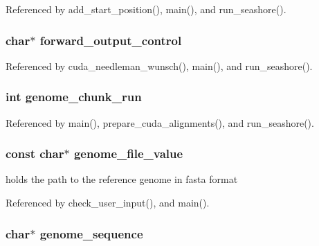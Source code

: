 Referenced by add\_\-start\_\-position(), main(), and run\_\-seashore().
\subsubsection[{forward\_\-output\_\-control}]{\setlength{\rightskip}{0pt plus 5cm}char$\ast$ {\bf forward\_\-output\_\-control}}\label{saruman_8h_a9bcc1c47ac7531838eb940e9fec11d6}




Referenced by cuda\_\-needleman\_\-wunsch(), main(), and run\_\-seashore().
\subsubsection[{genome\_\-chunk\_\-run}]{\setlength{\rightskip}{0pt plus 5cm}int {\bf genome\_\-chunk\_\-run}}\label{saruman_8h_ec3c87c657281aeef6d94cbbac6dba5a}




Referenced by main(), prepare\_\-cuda\_\-alignments(), and run\_\-seashore().
\subsubsection[{genome\_\-file\_\-value}]{\setlength{\rightskip}{0pt plus 5cm}const char$\ast$ {\bf genome\_\-file\_\-value}}\label{saruman_8h_0f4d9b412b31c8472a2ffbfde3c1f03f}


holds the path to the reference genome in fasta format 

Referenced by check\_\-user\_\-input(), and main().
\subsubsection[{genome\_\-sequence}]{\setlength{\rightskip}{0pt plus 5cm}char$\ast$ {\bf genome\_\-sequence}}\label{saruman_8h_571c0bdece58dc19b6806fae78c2cfa6}




